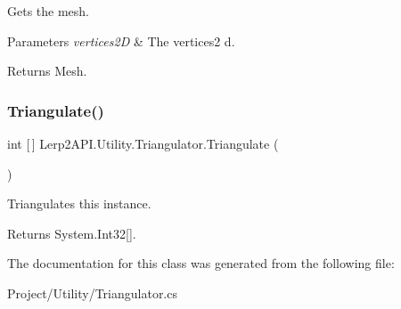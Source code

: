 Gets the mesh. 


\begin{DoxyParams}{Parameters}
{\em vertices2D} & The vertices2 d.\\
\hline
\end{DoxyParams}
\begin{DoxyReturn}{Returns}
Mesh.
\end{DoxyReturn}
\mbox{\label{class_lerp2_a_p_i_1_1_utility_1_1_triangulator_a88b04de93434765b8d2326f1bd180a08}} 
\subsubsection{\texorpdfstring{Triangulate()}{Triangulate()}}
{\footnotesize\ttfamily int \mbox{[}$\,$\mbox{]} Lerp2\+A\+P\+I.\+Utility.\+Triangulator.\+Triangulate (\begin{DoxyParamCaption}{ }\end{DoxyParamCaption})\hspace{0.3cm}{\ttfamily [inline]}}



Triangulates this instance. 

\begin{DoxyReturn}{Returns}
System.\+Int32\mbox{[}\mbox{]}.
\end{DoxyReturn}


The documentation for this class was generated from the following file\+:\begin{DoxyCompactItemize}
\item 
Project/\+Utility/Triangulator.\+cs\end{DoxyCompactItemize}
